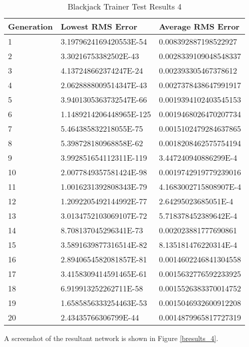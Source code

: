 \begin{center}
    \begin{longtable}{ | l | l | l |}
      \caption{Blackjack Trainer Test Results 4} \label{btr4} \\
   \hline
  Generation & Lowest RMS Error & Average RMS Error \\ \hline
1 &	3.1979624169420553E-54 &	0.008392887198522927 \\ \hline
2 &	3.30216753382502E-43 &	0.0028339109048548337 \\ \hline
3 &	4.137248662374247E-24 &	0.002393305467378612 \\ \hline
4 &	2.0628888009514347E-43 &	0.0027378438647991917 \\ \hline
5 &	3.9401305363732547E-66 &	0.0019394102403545153 \\ \hline
6 &	1.1489214206448965E-125 &	0.0019468026470207734 \\ \hline
7 &	5.464385832218055E-75 &	0.0015102479284637865 \\ \hline
8 &	5.398728180968858E-62 &	0.0018208462575754194 \\ \hline
9 &	3.992851654112311E-119 &	3.447240940886299E-4 \\ \hline
10 &	2.0077849357581424E-98 &	0.0019742919779239016 \\ \hline
11 &	1.0016231392808343E-79 &	4.1683002715808907E-4 \\ \hline
12 &	1.2092205492144992E-77 &	2.64295023685051E-4 \\ \hline
13 &	3.0134752103069107E-72 &	5.718378452389642E-4 \\ \hline
14 &	8.708137045296341E-73 &	0.002023881777690861 \\ \hline
15 &	3.5891639877316514E-82 &	8.135181476220314E-4 \\ \hline
16 &	2.8940654582081857E-81 &	0.0014602246841304558 \\ \hline
17 &	3.4158309414591465E-61 &	0.0015632776592233925 \\ \hline
18 &	6.919913252262711E-58 &	0.0015526383370014752 \\ \hline
19 &	1.6585856333254463E-53 &	0.0015046932600912208 \\ \hline
20 &	2.43435766306799E-44 &	0.0014879965817727319 \\ \hline
\end{longtable}
\end{center}

A screenshot of the resultant network is shown in Figure \ref{bresults_4}.

